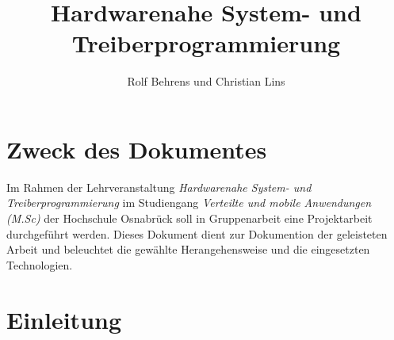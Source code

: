 \documentclass[a4paper,11pt]{article}
\title{Hardwarenahe System- und Treiberprogrammierung}
\author{\parbox{7cm}{Rolf Behrens und Christian Lins}}
\begin{document}
\sloppy

\maketitle
\tableofcontents
\section{Zweck des Dokumentes}
Im Rahmen der Lehrveranstaltung \textit{Hardwarenahe System- und Treiberprogrammierung} im Studiengang \textit{Verteilte und mobile Anwendungen (M.Sc)} der Hochschule Osnabrück soll in Gruppenarbeit eine Projektarbeit durchgeführt werden. Dieses Dokument dient zur Dokumention der geleisteten Arbeit und beleuchtet die gewählte Herangehensweise und die eingesetzten Technologien.

\section{Einleitung}
\end{document}
